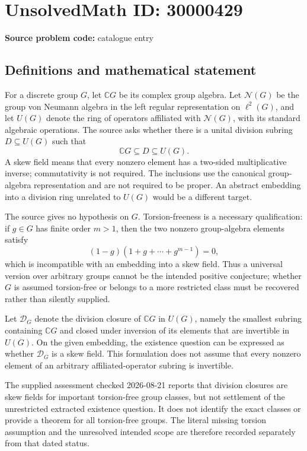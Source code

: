 \documentclass[11pt]{article}
\newcommand{\C}{\mathbb{C}}
\begin{document}
\section*{UnsolvedMath ID: 30000429}
\textbf{Source problem code:} catalogue entry
\subsection{Definitions and mathematical statement}
For a discrete group \(G\), let \(\C G\) be its complex group algebra. Let \(\mathcal N(G)\) be the group von Neumann algebra in the left regular representation on \(\ell^2(G)\), and let \(U(G)\) denote the ring of operators affiliated with \(\mathcal N(G)\), with its standard algebraic operations. The source asks whether there is a unital division subring \(D\subseteq U(G)\) such that
\[
\C G\subseteq D\subseteq U(G).
\]
A skew field means that every nonzero element has a two-sided multiplicative inverse; commutativity is not required. The inclusions use the canonical group-algebra representation and are not required to be proper. An abstract embedding into a division ring unrelated to \(U(G)\) would be a different target.

The source gives no hypothesis on \(G\). Torsion-freeness is a necessary qualification: if \(g\in G\) has finite order \(m>1\), then the two nonzero group-algebra elements satisfy
\[
(1-g)(1+g+\cdots+g^{m-1})=0,
\]
which is incompatible with an embedding into a skew field. Thus a universal version over arbitrary groups cannot be the intended positive conjecture; whether \(G\) is assumed torsion-free or belongs to a more restricted class must be recovered rather than silently supplied.

Let \(\mathcal D_G\) denote the division closure of \(\C G\) in \(U(G)\), namely the smallest subring containing \(\C G\) and closed under inversion of its elements that are invertible in \(U(G)\). On the given embedding, the existence question can be expressed as whether \(\mathcal D_G\) is a skew field. This formulation does not assume that every nonzero element of an arbitrary affiliated-operator subring is invertible.

The supplied assessment checked 2026-08-21 reports that division closures are skew fields for important torsion-free group classes, but not settlement of the unrestricted extracted existence question. It does not identify the exact classes or provide a theorem for all torsion-free groups. The literal missing torsion assumption and the unresolved intended scope are therefore recorded separately from that dated status.
\end{document}
